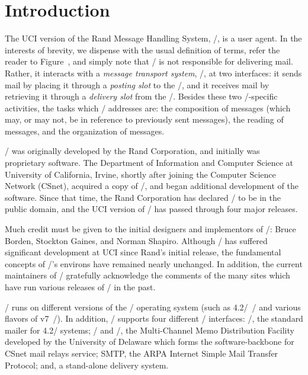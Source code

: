 
\banner

\section{Introduction}				%

The UCI version of the Rand Message Handling System, \MH/,
is a user agent.
In the interests of brevity,
we dispense with the usual definition of terms,
refer the reader to Figure~\mtsmodel,
and simply note that \MH/ is not responsible for delivering mail.
Rather,
it interacts with a {\it message transport system}, \MTS/,
at two interfaces:
it sends mail by placing it through a {\it posting slot} to the \MTS/,
and it receives mail by retrieving it through a {\it delivery slot} from the
\MTS/.
Besides these two \MTS/-specific activities,
the tasks which \MH/ addresses are:
the composition of messages
(which may, or may not, be in reference to previously sent messages),
the reading of messages,
and the organization of messages.

\MH/ was originally developed by the Rand Corporation,
and initially was proprietary software.
The Department of Information and Computer Science at
University of California, Irvine,
shortly after joining the Computer Science Network (CSnet),
acquired a copy of \MH/,
and began additional development of the software.
Since that time,
the Rand Corporation has declared \MH/ to be in the public domain,
and the UCI version of \MH/ has passed through four major releases.

Much credit must be given to the initial designers and implementors of \MH/:
Bruce Borden, Stockton Gaines, and Norman Shapiro.
Although \MH/ has suffered significant development at UCI
since Rand's initial release,
the fundamental concepts of \MH/'s environs have remained nearly unchanged.
In addition,
the current maintainers of \MH/ gratefully acknowledge the comments of the
many sites which have run various releases of \MH/ in the past.

\MH/ runs on different versions of the \unix/ operating system
(such as 4.2\bsd/~\unix/ and various flavors of v7~\unix/).
In addition,
\MH/ supports four different \MTS/ interfaces:
\SendMail/\cite{EAllm83},
the standard mailer for 4.2\bsd/ systems;
\MMDF/\cite{DCroc79} and \MMDFII/\cite{DKing84},
the Multi-Channel Memo Distribution Facility developed by the University of
Delaware
which forms the software-backbone for CSnet\cite{DCome83} mail relays service;
SMTP,
the ARPA Internet Simple Mail Transfer Protocol\cite{SMTP};
and,
a stand-alone delivery system.

